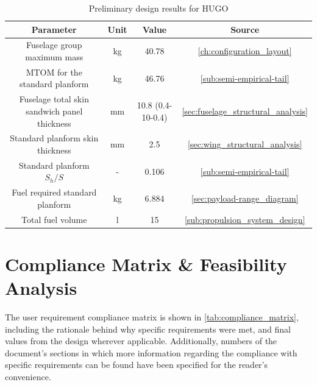 \begin{table}[h]
    \centering
    \caption{Preliminary design results for HUGO}
    \begin{tabular}{|c|c|c|c|}\hline
        \textbf{Parameter} & \textbf{Unit} & \textbf{Value} & \textbf{Source}  \\\hline
         Fuselage group maximum mass & kg & 40.78 & \autoref{ch:configuration_layout}\\\hline
         MTOM for the standard planform & kg& 46.76 &\autoref{sub:semi-empirical-tail} \\\hline
         Fuselage total skin sandwich panel thickness& mm &10.8 (0.4-10-0.4) & \autoref{sec:fuselage_structural_analysis} \\\hline
         Standard planform skin thickness& mm & 2.5 & \autoref{sec:wing_structural_analysis}\\\hline
         Standard planform $S_h/S$& - & 0.106 & \autoref{sub:semi-empirical-tail} \\\hline
         
         Fuel required standard planform& kg & 6.884 & \autoref{sec:payload-range_diagram} \\\hline

         Total fuel volume & l & 15& \autoref{sub:propulsion_system_design} \\\hline
    \end{tabular}
    
    \label{tab:final-design-overview}
\end{table}



\section{Compliance Matrix \& Feasibility Analysis}
\label{sec:compliance_matrix_feasibility_analysis}

The user requirement compliance matrix is shown in \autoref{tab:compliance_matrix}, including the rationale behind why specific requirements were met, and final values from the design wherever applicable. Additionally, numbers of the document's sections in which more information regarding the compliance with specific requirements can be found have been specified for the reader's convenience.

